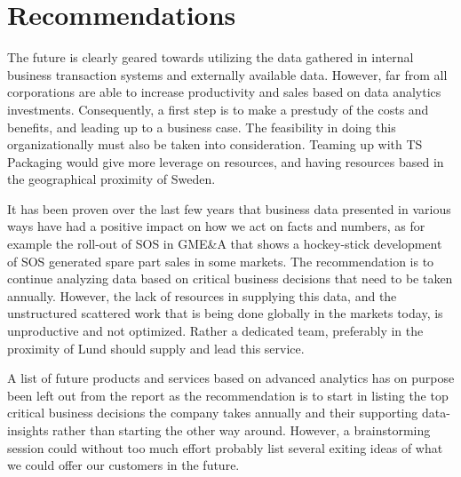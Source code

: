\documentclass[10pt]{article} %
\begin{document}
\section{Recommendations}

The future is clearly geared towards utilizing the data gathered in internal business transaction systems and externally available data. However, far from all corporations are able to increase productivity and sales based on data analytics investments. Consequently, a first step is to make a prestudy of the costs and benefits, and leading up to a business case. The feasibility in doing this organizationally must also be taken into consideration. Teaming up with TS Packaging would give more leverage on resources, and having resources based in the geographical proximity of Sweden.

It has been proven over the last few years that business data presented in various ways have had a positive impact on how we act on facts and numbers, as for example the roll-out of SOS in GME\&A that shows a hockey-stick development of SOS generated spare part sales in some markets. The recommendation is to continue analyzing data based on critical business decisions that need to be taken annually. However, the lack of resources in supplying this data, and the unstructured scattered work that is being done globally in the markets today, is unproductive and not optimized. Rather a dedicated team, preferably in the proximity of Lund should supply and lead this service.

A list of future products and services based on advanced analytics has on purpose been left out from the report as the recommendation is to start in listing the top critical business decisions the company takes annually and their supporting data-insights rather than starting the other way around. However, a brainstorming session could without too much effort probably list several exiting ideas of what we could offer our customers in the future.
\end{document}
